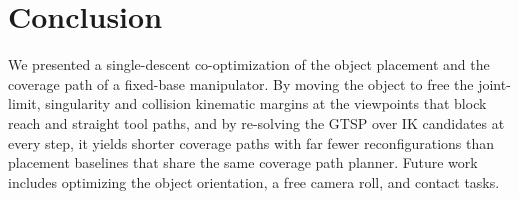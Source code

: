 \documentclass[letterpaper, journal, twoside]{IEEEtran}
\begin{document}
\section{Conclusion}
We presented a single-descent co-optimization of the object placement and the coverage path of a fixed-base manipulator. By moving the object to free the joint-limit, singularity and collision kinematic margins at the viewpoints that block reach and straight tool paths, and by re-solving the GTSP over IK candidates at every step, it yields shorter coverage paths with far fewer reconfigurations than placement baselines that share the same coverage path planner. Future work includes optimizing the object orientation, a free camera roll, and contact tasks.



\end{document}
